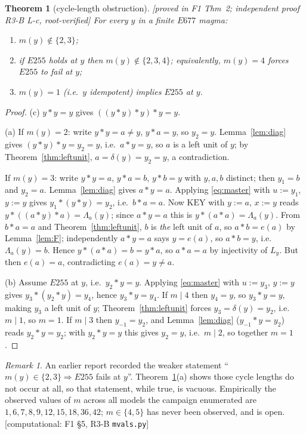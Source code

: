 \documentclass[11pt]{article}
\theoremstyle{plain}
\newtheorem{theorem}{Theorem}[section]
\theoremstyle{definition}
\theoremstyle{remark}
\newtheorem*{remark*}{Remark}
\numberwithin{equation}{section}
\newcommand{\op}{\mathbin{*}}
\newcommand{\statusbox}[1]{{\small\sloppy\textsf{[#1]}}}
\newcommand{\PROVED}[1]{\statusbox{proved in #1, root-verified}}
\newcommand{\COMP}[1]{\statusbox{computational: #1}}
\begin{document}
\begin{theorem}[cycle-length obstruction]\label{thm:cycle}
\PROVED{F1 Thm~2; independent proof R3-B L-c}
For every $y$ in a finite $E677$ magma:
\begin{enumerate}
\item[(a)] $m(y)\notin\{2,3\}$;
\item[(b)] if $E255$ holds at $y$ then $m(y)\notin\{2,3,4\}$; equivalently,
$m(y) = 4$ forces $E255$ to fail at $y$;
\item[(c)] $m(y) = 1$ (i.e.\ $y$ idempotent) implies $E255$ at $y$.
\end{enumerate}
\end{theorem}

\begin{proof}
(c) $y\op y = y$ gives $((y\op y)\op y)\op y = y$.

(a) If $m(y)=2$: write $y\op y = a \ne y$, $y\op a = y$, so $y_2 = y$. Lemma~\ref{lem:diag}
gives $(y\op y)\op y = y_2 = y$, i.e.\ $a\op y = y$, so $a$ is a left unit of $y$; by
Theorem~\ref{thm:leftunit}, $a = \delta(y) = y_2 = y$, a contradiction.

If $m(y)=3$: write $y\op y = a$, $y\op a = b$, $y\op b = y$ with $y,a,b$ distinct; then
$y_1 = b$ and $y_2 = a$. Lemma~\ref{lem:diag} gives $a\op y = a$. Applying \eqref{eq:master}
with $u := y_1$, $y := y$ gives $y_1\op(y\op y) = y_2$, i.e.\ $b\op a = a$. Now $\mathrm{KEY}$
with $y := a$, $x := y$ reads $y\op((a\op y)\op a) = \Lambda_a(y)$; since $a\op y = a$ this
is $y\op(a\op a) = \Lambda_a(y)$. From $b\op a = a$ and Theorem~\ref{thm:leftunit}, $b$ is
\emph{the} left unit of $a$, so $a\op b = e(a)$ by Lemma~\ref{lem:F}; independently
$a\op y = a$ says $y = e(a)$, so $a\op b = y$, i.e.\ $\Lambda_a(y) = b$. Hence
$y\op(a\op a) = b = y\op a$, so $a\op a = a$ by injectivity of $L_y$. But then $e(a) = a$,
contradicting $e(a) = y \ne a$.

(b) Assume $E255$ at $y$, i.e.\ $y_2\op y = y$. Applying \eqref{eq:master} with $u := y_3$,
$y := y$ gives $y_3\op(y_2\op y) = y_4$, hence $y_3\op y = y_4$. If $m \mid 4$ then
$y_4 = y$, so $y_3\op y = y$, making $y_3$ a left unit of $y$; Theorem~\ref{thm:leftunit}
forces $y_3 = \delta(y) = y_2$, i.e.\ $m\mid 1$, so $m = 1$. If $m\mid 3$ then
$y_{-1} = y_2$, and Lemma~\ref{lem:diag} ($y_{-1}\op y = y_2$) reads $y_2\op y = y_2$; with
$y_2\op y = y$ this gives $y_2 = y$, i.e.\ $m\mid 2$, so together $m = 1$.
\end{proof}

\begin{remark*}
An earlier report \cite[L3]{F5} recorded the weaker statement ``$m(y)\in\{2,3\}\Rightarrow
E255$ fails at $y$''. Theorem~\ref{thm:cycle}(a) shows those cycle lengths do not occur at
all, so that statement, while true, is vacuous. Empirically the observed values of $m$ across
all models the campaign enumerated are $1,6,7,8,9,12,15,18,36,42$; $m\in\{4,5\}$ has never
been observed, and is open. \COMP{F1 \S5, R3-B \texttt{mvals.py}}
\end{remark*}
\end{document}
